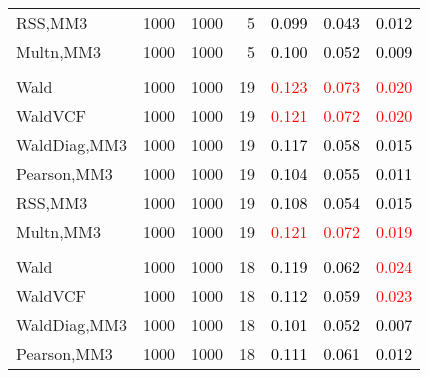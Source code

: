 \documentclass[
]{article}
\begin{document}
\begin{table}[H]
{\begin{tabular}[t]{lrrrrrr}
\hspace{1em}RSS,MM3 & 1000 & 1000 & 5 & \textcolor{black}{0.099} & \textcolor{black}{0.043} & \textcolor{black}{0.012}\\
\hspace{1em}Multn,MM3 & 1000 & 1000 & 5 & \textcolor{black}{0.100} & \textcolor{black}{0.052} & \textcolor{black}{0.009}\\
\addlinespace[0.3em]
\multicolumn{7}{l}{\textbf{1F 15V}}\\
\hspace{1em}Wald & 1000 & 1000 & 19 & \textcolor{red}{0.123} & \textcolor{red}{0.073} & \textcolor{red}{0.020}\\
\hspace{1em}WaldVCF & 1000 & 1000 & 19 & \textcolor{red}{0.121} & \textcolor{red}{0.072} & \textcolor{red}{0.020}\\
\hspace{1em}WaldDiag,MM3 & 1000 & 1000 & 19 & \textcolor{black}{0.117} & \textcolor{black}{0.058} & \textcolor{black}{0.015}\\
\hspace{1em}Pearson,MM3 & 1000 & 1000 & 19 & \textcolor{black}{0.104} & \textcolor{black}{0.055} & \textcolor{black}{0.011}\\
\hspace{1em}RSS,MM3 & 1000 & 1000 & 19 & \textcolor{black}{0.108} & \textcolor{black}{0.054} & \textcolor{black}{0.015}\\
\hspace{1em}Multn,MM3 & 1000 & 1000 & 19 & \textcolor{red}{0.121} & \textcolor{red}{0.072} & \textcolor{red}{0.019}\\
\addlinespace[0.3em]
\multicolumn{7}{l}{\textbf{2F 10V}}\\
\hspace{1em}Wald & 1000 & 1000 & 18 & \textcolor{black}{0.119} & \textcolor{black}{0.062} & \textcolor{red}{0.024}\\
\hspace{1em}WaldVCF & 1000 & 1000 & 18 & \textcolor{black}{0.112} & \textcolor{black}{0.059} & \textcolor{red}{0.023}\\
\hspace{1em}WaldDiag,MM3 & 1000 & 1000 & 18 & \textcolor{black}{0.101} & \textcolor{black}{0.052} & \textcolor{black}{0.007}\\
\hspace{1em}Pearson,MM3 & 1000 & 1000 & 18 & \textcolor{black}{0.111} & \textcolor{black}{0.061} & \textcolor{black}{0.012}\\

\end{tabular}}
\end{table}
\end{document}
